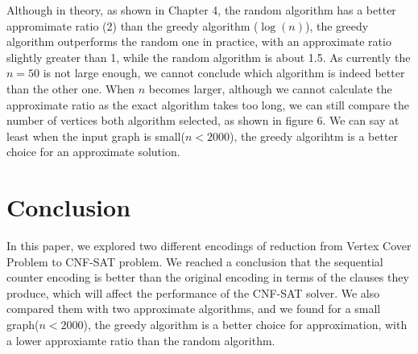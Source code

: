 \documentclass[11pt]{article}
\begin{document}
Although in theory, as shown in Chapter 4, the random algorithm has a better appromimate ratio (2) than the greedy algorithm ($\log(n)$), the greedy algorithm outperforms the random one in practice, with an approximate ratio slightly greater than 1, while the random algorithm is about 1.5. As currently the $n=50$ is not large enough, we cannot conclude which algorithm is indeed better than the other one. When $n$ becomes larger, although we cannot calculate the approximate ratio as the exact algorithm takes too long, we can still compare the number of vertices both algorithm selected, as shown in figure 6. We can say at least when the input graph is small($n<2000$), the greedy algorihtm is a better choice for an approximate solution.

\section{Conclusion}\label{section-conclusion}
In this paper, we explored two different encodings of reduction from Vertex Cover Problem to CNF-SAT problem. We reached a conclusion that the sequential counter encoding is better than the original encoding in terms of the clauses they produce, which will affect the performance of the CNF-SAT solver. We also compared them with two approximate algorithms, and we found for a small graph($n<2000$), the greedy algorithm is a better choice for approximation, with a lower approxiamte ratio than the random algorithm.


\end{document}
